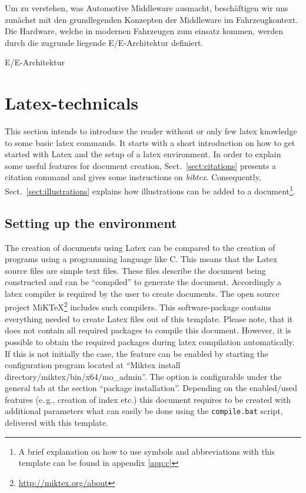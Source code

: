 Um zu verstehen, was Automotive Middleware ausmacht, beschäftigen wir uns zunächst mit den grundlegenden Konzepten der Middleware im Fahrzeugkontext. Die Hardware, welche in modernen Fahrzeugen zum einsatz kommen, werden durch die zugrunde liegende E/E-Architektur definiert.
\begin{definition}{E/E-Architektur}
	
\end{definition}


\section{Latex-technicals}
\label{sect:latex}

This section intends to introduce the reader without or only few latex knowledge to some basic latex commands.
It starts with a short introduction on how to get started with Latex and the setup of a latex environment.
In order to explain some useful features for document creation, Sect.~\ref{sect:citations} presents a citation command and gives some instructions on \textit{bibtex}.
Consequently, Sect.~\ref{sect:illustrations} explains how illustrations can be added to a document\footnote{A brief explanation on how to use symbols and abbreviations with this template can be found in appendix \ref{app:c}}.

\subsection{Setting up the environment}
\label{sect:latexenvironment}
The creation of documents using Latex can be compared to the creation of programs using a programming language like C.
This means that the Latex source files are simple text files.
These files describe the document being constructed and can be \enquote{compiled} to generate the document.
Accordingly a latex compiler is required by the user to create documents.
The open source project MiKTeX\footnote{\url{http://miktex.org/about}} includes such compilers.
This software-package contains everything needed to create Latex files out of this template.
Please note, that it does not contain all required packages to compile this document.
However, it is possible to obtain the required packages during latex compilation automatically.
If this is not initially the case, the feature can be enabled by starting the configuration program located at \enquote{Miktex install directory/miktex/bin/x64/mo\_admin}.
The option is configurable under the general tab at the section \enquote{package installation}.
Depending on the enabled/used features (e.\,g., creation of index etc.) this document requires to be created with additional parameters what can easily be done using the \texttt{compile.bat} script, delivered with this template.

